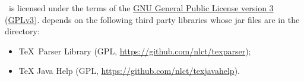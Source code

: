 %
\appname\ is licensed under the terms of the 
\href{https://www.gnu.org/licenses/gpl-3.0.html}{GNU General
Public License version 3 (GPLv3)}.
 depends on the following third party libraries whose jar files are
in the  directory:
\begin{itemize}
   \item \TeX\ Parser Library 
   (GPL, \url{https://github.com/nlct/texparser});
   \item TeX Java Help 
   (GPL, \url{https://github.com/nlct/texjavahelp}).
\end{itemize}



\printmain
\printindex 

 

